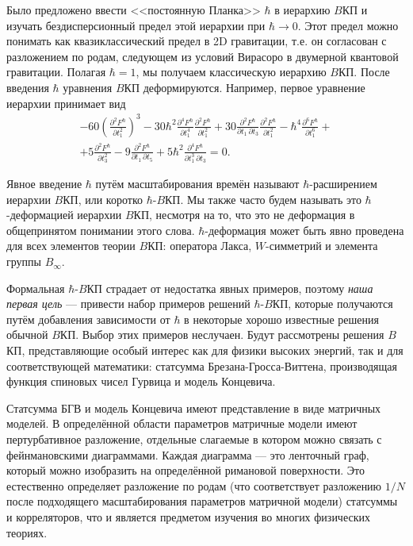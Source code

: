 \documentclass[a4paper,14pt]{extarticle}
\numberwithin{equation}{section}
\begin{document}
Было предложено ввести  <<постоянную Планка>> $\hbar $ 
в иерархию $B$КП и изучать бездисперсионный предел
этой иерархии при $\hbar \to 0$. Этот предел
можно  понимать как квазиклассический предел в 2D гравитации,
 т.\:е. он согласован с разложением по родам, следующем
из условий Вирасоро в двумерной квантовой гравитации.
Полагая $\hbar =1$,  мы получаем классическую иерархию
$B$КП. После введения $\hbar $ уравнения $B$КП деформируются.
Например, первое уравнение иерархии принимает вид
 \begin{multline}
-60 \left(\frac{\partial ^2F^\hbar }{\partial
   t_1^2}\right)^3-30\hbar ^2 \frac{\partial ^4F^\hbar }{\partial
   t_1^4} \frac{\partial ^2F^\hbar }{\partial
   t_1^2}+30 \frac{\partial ^2F^\hbar }{\partial t_1\, \partial t_3}
   \frac{\partial ^2F^\hbar }{\partial t_1^2}-\hbar ^4\frac{\partial
   ^6F^\hbar }{\partial t_1^6}+\\+5 \frac{\partial ^2F^\hbar }{\partial
   t_3^2}-9 \frac{\partial ^2F^\hbar }{\partial t_1\, \partial t_5}+5
   \hbar ^2\frac{\partial ^4F^\hbar }{\partial t_1^3\, \partial t_3}=0	
	\label{}
.\end{multline}

Явное введение $\hbar $ путём масштабирования времён
называют $\hbar $-расширением иерархии  $B$КП,  или
коротко $\hbar $-$B$КП. Мы также часто будем называть
это $\hbar $-деформацией иерархии $B$КП, несмотря на то, что
это не деформация в общепринятом понимании этого слова.
$\hbar $-деформация может быть явно проведена для
всех элементов теории $B$КП: оператора Лакса, $W$-симметрий
и элемента группы $B_\infty$.

Формальная $\hbar $-$B$КП страдает от недостатка явных
примеров, поэтому \emph{наша первая цель} ---
привести набор примеров решений $\hbar $-$B$КП,
которые получаются путём добавления зависимости от $\hbar $ 
в некоторые хорошо известные решения обычной $B$КП.
Выбор этих примеров неслучаен. Будут рассмотрены решения
$B$КП, представляющие особый интерес как для физики высоких энергий, так и для соответствующей математики: статсумма Брезана-Гросса-Виттена, производящая функция спиновых чисел Гурвица и модель Концевича. 

Статсумма БГВ и модель
Концевича имеют представление в виде матричных моделей. 
В определённой области параметров матричные модели имеют
пертурбативное разложение, отдельные слагаемые в котором
можно связать с фейнмановскими диаграммами. Каждая диаграмма --- это ленточный граф, который можно изобразить на определённой
римановой поверхности.  Это естественно определяет разложение
по родам (что соответствует разложению $1 /N$ после
подходящего масштабирования параметров матричной модели)
статсуммы и корреляторов, что и является предметом
изучения во многих физических теориях.
\end{document}
